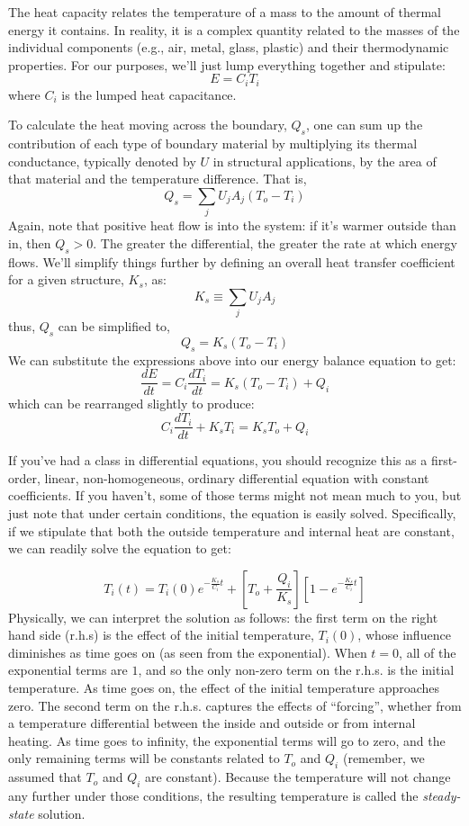 \documentclass[11pt]{article} %
\begin{document}
The heat capacity relates the temperature of a mass to the amount of thermal energy it contains. In reality, it is a complex quantity related to the masses of the individual components (e.g., air, metal, glass, plastic) and their thermodynamic properties. For our purposes, we'll just lump everything together and stipulate:
\[
E = C_{i}T_{i}
\]
%
where $C_{i}$ is the lumped heat capacitance. 

To calculate the heat moving across the boundary, $Q_{s}$, one can sum up the contribution of each type of boundary material by multiplying its thermal conductance, typically denoted by $U$ in structural applications, by the area of that material and the temperature difference. That is,
\[
Q_{s} = \sum_jU_jA_j\left(T_{o} - T_{i}\right)
\] 
%
Again, note that positive heat flow is into the system: if it's warmer outside than in, then $Q_{s}>0$. The greater the differential, the greater the rate at which energy flows. We'll simplify things further by defining an overall heat transfer coefficient for a given structure, $K_s$, as:
\[
K_s\equiv  \sum_jU_jA_j
\]
%
thus, $Q_{s}$ can be simplified to,
\[
Q_{s} = K_s\left(T_{o} - T_{i}\right)
\]
We can substitute the expressions above into our energy balance equation to get:
\[
\frac{dE}{dt} = C_{i}\frac{dT_{i}}{dt} = K_s\left(T_{o} - T_{i}\right) + Q_{i}
\]
which can be rearranged slightly to produce:
\begin{equation}
C_{i}\frac{dT_{i}}{dt} + K_s T_{i}=  K_sT_{o} + Q_{i}
\label{eq:gov.eq}
\end{equation}

If you've had a class in differential equations, you should recognize this as a first-order, linear, non-homogeneous, ordinary differential equation with constant coefficients. If you haven't, some of those terms might not mean much to you, but just note that under certain conditions, the equation is easily solved. Specifically, if we stipulate that both the outside temperature and internal heat are constant, we can readily solve the equation to get:

\begin{equation}
T_i(t) = T_i(0)e^{-\frac {K_s} {C_i} t}  +  \left[T_o+\frac {Q_i} {K_s}\right]\left[1-e^{-\frac {K_s} {C_i} t} \right]
\label{eq:solution}
\end{equation}
%
Physically, we can interpret the solution as follows: the first term on the right hand side (r.h.s) is the effect of the initial temperature, $T_{i}(0)$, whose influence diminishes as time goes on (as seen from the exponential). When $t=0$, all of the exponential terms are $1$, and so the only non-zero term on the r.h.s. is the initial temperature. As time goes on, the effect of the initial temperature approaches zero. The second term on the r.h.s. captures the effects of ``forcing'', whether from a temperature differential between the inside and outside or from internal heating. As time goes to infinity, the exponential terms will go to zero, and the only remaining terms will be constants related to $T_{o}$ and $Q_{i}$ (remember, we assumed that $T_{o}$ and $Q_{i}$ are constant). Because the temperature will not change any further under those conditions, the resulting temperature is called the \emph{steady-state} solution.
\end{document}
